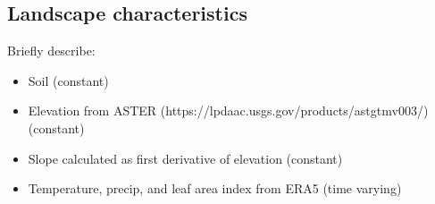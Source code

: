 \subsection{Landscape characteristics}

Briefly describe: 

\begin{itemize}
    \item Soil (constant)
    \item Elevation from ASTER (https://lpdaac.usgs.gov/products/astgtmv003/)  (constant)
    \item Slope calculated as first derivative of elevation (constant)
    \item Temperature, precip, and leaf area index from ERA5 (time varying)
\end{itemize}

